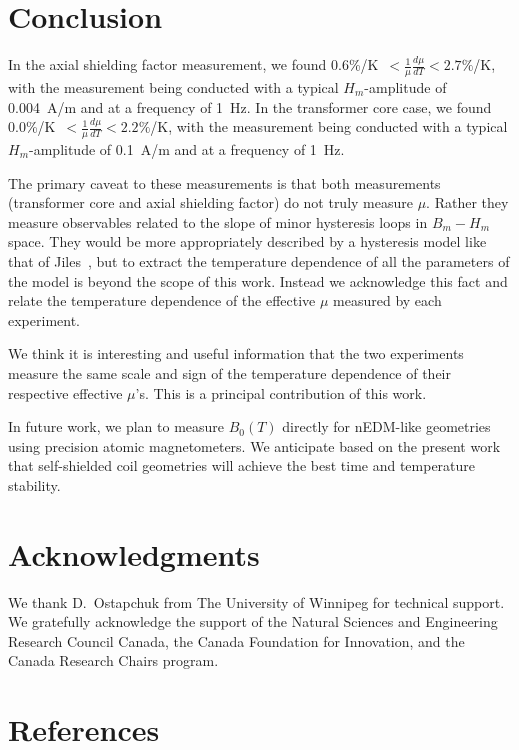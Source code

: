 \documentclass[review]{elsarticle}
\begin{document}
\section{Conclusion}

In the axial shielding factor measurement, we found
0.6\%/K~$<\frac{1}{\mu}\frac{d\mu}{dT}<2.7\%$/K, with the measurement
being conducted with a typical $H_m$-amplitude of 0.004~A/m and at a
frequency of 1~Hz.  In the transformer core case, we found
0.0\%/K~$<\frac{1}{\mu}\frac{d\mu}{dT}<2.2\%$/K, with the measurement
being conducted with a typical $H_m$-amplitude of 0.1~A/m and at a
frequency of 1~Hz.

The primary caveat to these measurements is that both measurements
(transformer core and axial shielding factor) do not truly measure
$\mu$.  Rather they measure observables related to the slope of minor
hysteresis loops in $B_m-H_m$ space.  They would be more appropriately
described by a hysteresis model like that of Jiles~\cite{bib:jiles},
but to extract the temperature dependence of all the parameters of the
model is beyond the scope of this work.  Instead we acknowledge this
fact and relate the temperature dependence of the effective $\mu$
measured by each experiment.

We think it is interesting and useful information that the two
experiments measure the same scale and sign of the temperature
dependence of their respective effective $\mu$'s.  This is a principal
contribution of this work.

In future work, we plan to measure $B_0(T)$ directly for nEDM-like
geometries using precision atomic magnetometers.  We anticipate based
on the present work that self-shielded coil geometries will achieve
the best time and temperature stability.



\section{Acknowledgments}

We thank D.~Ostapchuk from The University of Winnipeg for technical
support.  We gratefully acknowledge the support of the Natural
Sciences and Engineering Research Council Canada, the Canada
Foundation for Innovation, and the Canada Research Chairs program.


\section*{References}
\end{document}
